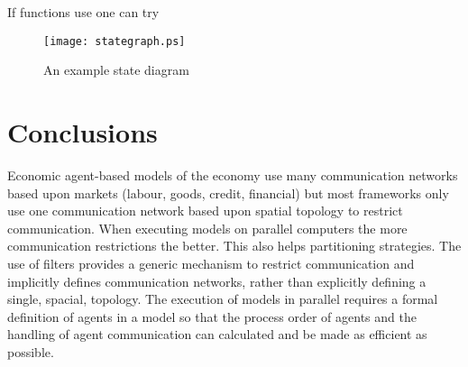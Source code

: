 \documentclass{aamas2009}
\begin{document}
If functions use one can try 




% 
% 

\begin{figure}[hbp]
\centering
\texttt{[image: stategraph.ps]}
\caption{An example state diagram}
\end{figure}









% 
% 
% 
% 

\section{Conclusions}

Economic agent-based models of the economy use many communication networks
based upon markets (labour, goods, credit, financial) but most frameworks only
use one communication network based upon spatial topology to restrict
communication.
When executing models on parallel computers the more communication restrictions
the better. This also helps partitioning strategies.
The use of filters provides a generic mechanism to restrict communication and
implicitly defines communication networks, rather than explicitly defining a
single, spacial, topology.
The execution of models in parallel requires a formal definition of agents in
a model so that the process order of agents and the handling of agent
communication can calculated and be made as efficient as possible.
\end{document}
